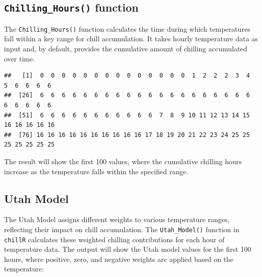 \documentclass[
]{article}
\newenvironment{Shaded}{\begin{snugshade}}{\end{snugshade}}
\newcommand{\DecValTok}[1]{\textcolor[rgb]{0.00,0.00,0.81}{#1}}
\newcommand{\FunctionTok}[1]{\textcolor[rgb]{0.13,0.29,0.53}{\textbf{#1}}}
\newcommand{\NormalTok}[1]{#1}
\newcommand{\SpecialCharTok}[1]{\textcolor[rgb]{0.81,0.36,0.00}{\textbf{#1}}}
\begin{document}
\subsection{\texorpdfstring{\texttt{Chilling\_Hours()} function}{Chilling\_Hours() function}}\label{chilling_hours-function}

The \texttt{Chilling\_Hours()} function calculates the time during which temperatures fall within a key range for chill accumulation. It takes hourly temperature data as input and, by default, provides the cumulative amount of chilling accumulated over time.

\begin{Shaded}
\end{Shaded}

\begin{verbatim}
##   [1]  0  0  0  0  0  0  0  0  0  0  0  0  0  0  1  2  2  2  3  4  5  6  6  6  6
##  [26]  6  6  6  6  6  6  6  6  6  6  6  6  6  6  6  6  6  6  6  6  6  6  6  6  6
##  [51]  6  6  6  6  6  6  6  6  6  6  6  7  8  9 10 11 12 13 14 15 16 16 16 16 16
##  [76] 16 16 16 16 16 16 16 16 16 16 17 18 19 20 21 22 23 24 25 25 25 25 25 25 25
\end{verbatim}

The result will show the first 100 values, where the cumulative chilling hours increase as the temperature falls within the specified range.

\subsection{Utah Model}\label{utah-model}

The Utah Model assigns different weights to various temperature ranges, reflecting their impact on chill accumulation. The \texttt{Utah\_Model()} function in \texttt{chillR} calculates these weighted chilling contributions for each hour of temperature data. The output will show the Utah model values for the first 100 hours, where positive, zero, and negative weights are applied based on the temperature:

\begin{Shaded}
\end{Shaded}
\end{document}
